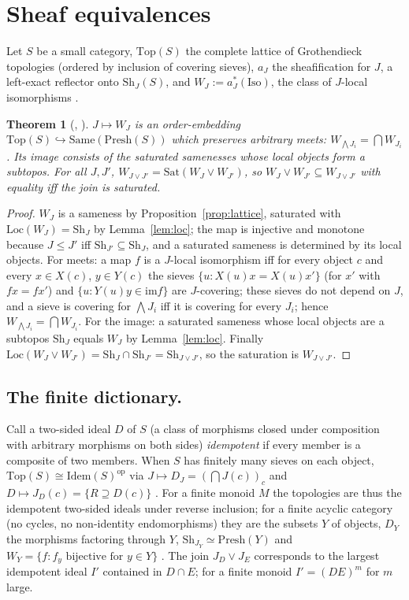 \documentclass[11pt]{amsart}
\newtheorem{thm}{Theorem}[section]
\theoremstyle{definition}
\newcommand{\Same}{\mathrm{Same}}
\newcommand{\Top}{\mathrm{Top}}
\newcommand{\Iso}{\mathrm{Iso}}
\newcommand{\Presh}{\mathrm{Presh}}
\newcommand{\Sh}{\mathrm{Sh}}
\newcommand{\Sat}{\mathrm{Sat}}
\newcommand{\Loc}{\mathrm{Loc}}
\newcommand{\Idem}{\mathrm{Idem}}
\begin{document}
\section{Sheaf equivalences}\label{sec:sheaf}

Let $S$ be a small category, $\Top(S)$ the complete lattice of Grothendieck
topologies (ordered by inclusion of covering sieves), $a_J$ the sheafification
for $J$, a left-exact reflector onto $\Sh_J(S)$, and
$W_J:=a_J^*(\Iso)$, the class of $J$-local isomorphisms \cite[III.7]{MLM}.

\begin{thm}[{\cite[Thm.~3.1]{Postnikov}, \cite[Thm.~3.1]{Topjoin}}]\label{thm:embed}
$J\mapsto W_J$ is an order-embedding $\Top(S)\hookrightarrow\Same(\Presh(S))$
which preserves arbitrary meets: $W_{\bigwedge J_i}=\bigcap W_{J_i}$. Its image
consists of the saturated samenesses whose local objects form a subtopos. For
all $J,J'$, $W_{J\vee J'}=\Sat(W_J\vee W_{J'})$, so $W_J\vee W_{J'}\subseteq
W_{J\vee J'}$ with equality iff the join is saturated.
\end{thm}
\begin{proof}
$W_J$ is a sameness by Proposition~\ref{prop:lattice}, saturated with
$\Loc(W_J)=\Sh_J$ by Lemma~\ref{lem:loc}; the map is injective and monotone
because $J\le J'$ iff $\Sh_{J'}\subseteq\Sh_J$, and a saturated sameness is
determined by its local objects. For meets: a map $f$ is a $J$-local
isomorphism iff for every object $c$ and every $x\in X(c)$, $y\in Y(c)$ the
sieves $\{u: X(u)x=X(u)x'\}$ (for $x'$ with $fx=fx'$) and
$\{u: Y(u)y\in\mathrm{im}f\}$ are $J$-covering; these sieves do not depend on
$J$, and a sieve is covering for $\bigwedge J_i$ iff it is covering for every
$J_i$; hence $W_{\bigwedge J_i}=\bigcap W_{J_i}$. For the image: a saturated
sameness whose local objects are a subtopos $\Sh_J$ equals $W_J$ by
Lemma~\ref{lem:loc}. Finally $\Loc(W_J\vee W_{J'})=\Sh_J\cap\Sh_{J'}=\Sh_{J\vee J'}$,
so the saturation is $W_{J\vee J'}$.
\end{proof}

\subsection{The finite dictionary.}
Call a two-sided ideal $D$ of $S$ (a class of morphisms closed under
composition with arbitrary morphisms on both sides) \emph{idempotent} if every
member is a composite of two members. When $S$ has finitely many sieves on each
object, $\Top(S)\cong\Idem(S)^{\mathrm{op}}$ via $J\mapsto D_J=(\bigcap J(c))_c$
and $D\mapsto J_D(c)=\{R\supseteq D(c)\}$ \cite[Thm.~5.1]{Postnikov}. For a
finite monoid $M$ the topologies are thus the idempotent two-sided ideals under
reverse inclusion; for a finite acyclic category (no cycles, no non-identity
endomorphisms) they are the subsets $Y$ of objects, $D_Y$ the morphisms
factoring through $Y$, $\Sh_{J_Y}\simeq\Presh(Y)$ and
$W_Y=\{f: f_y\text{ bijective for }y\in Y\}$ \cite[\S5]{Topjoin}. The join
$J_D\vee J_E$ corresponds to the largest idempotent ideal $I'$ contained in
$D\cap E$; for a finite monoid $I'=(DE)^m$ for $m$ large.
\end{document}
